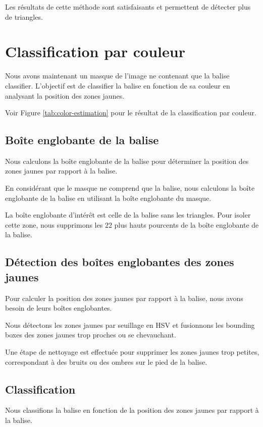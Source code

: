 \documentclass{article}
\begin{document}
Les résultats de cette méthode sont satisfaisants et permettent de détecter
plus de triangles.

\section{Classification par couleur}

Nous avons maintenant un masque de l'image ne contenant que la balise
classifier. L'objectif est de classifier la balise en fonction de sa couleur en
analysant la position des zones jaunes.

Voir Figure \ref{tab:color-estimation} pour le résultat de la classification par couleur.

\subsection{Boîte englobante de la balise}

Nous calculons la boîte englobante de la balise pour déterminer la position des
zones jaunes par rapport à la balise.

En considérant que le masque ne comprend que la balise, nous calculons la boîte
englobante de la balise en utilisant la boîte englobante du masque.

La boîte englobante d'intérêt est celle de la balise sans les triangles. Pour
isoler cette zone, nous supprimons les 22 plus hauts pourcents de la boîte
englobante de la balise.

\subsection{Détection des boîtes englobantes des zones jaunes}

Pour calculer la position des zones jaunes par rapport à la balise, nous avons
besoin de leurs boîtes englobantes.

Nous détectons les zones jaunes par seuillage en HSV et fusionnons les bounding
boxes des zones jaunes trop proches ou se chevauchant.

Une étape de nettoyage est effectuée pour supprimer les zones jaunes trop
petites, correspondant à des bruits ou des ombres sur le pied de la balise.

\subsection{Classification}

Nous classifions la balise en fonction de la position des zones jaunes par
rapport à la balise.
\end{document}
